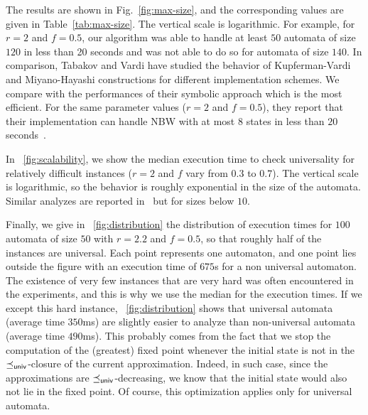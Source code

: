 \documentclass{LMCS}
\begin{document}
The results are shown in Fig.~\ref{fig:max-size}, and the corresponding 
values are given in Table~\ref{tab:max-size}. The vertical scale is logarithmic.
For example, for $r=2$ and $f=0.5$, our algorithm was able to handle at least $50$ automata of size $120$ 
in less than 20 seconds and was not able to do so for automata of size $140$.
In comparison, Tabakov and Vardi have studied the behavior of
Kupferman-Vardi and Miyano-Hayashi constructions for different
implementation schemes. We compare with the performances of their
symbolic approach which is the most efficient. 
For the same parameter values ($r=2$ and $f=0.5$), they
report that their implementation can handle NBW with at most 8 states 
in less than $20$ seconds~\cite{TabakovV07}.     

In \figurename~\ref{fig:scalability}, we show the median execution time to 
check universality for relatively difficult instances ($r=2$ and $f$ vary from
$0.3$ to $0.7$). The vertical scale is logarithmic, so the behavior is roughly 
exponential in the size of the automata. Similar analyzes are reported 
in~\cite{TabakovV07} but for sizes below $10$.

Finally, we give in \figurename~\ref{fig:distribution} the
distribution of execution times for $100$ automata of size $50$ with
$r=2.2$ and $f=0.5$, so that roughly half of the instances are
universal. Each point represents one automaton, and one point lies
outside the figure with an execution time of $675$s for a non
universal automaton. The existence of very few instances that are very
hard was often encountered in the experiments, and this is why we use
the median for the execution times. If we except this hard instance,
\figurename~\ref{fig:distribution} shows that universal automata
(average time $350$ms) are slightly easier to analyze than
non-universal automata (average time $490$ms).  This probably comes
from the fact that we stop the computation of the (greatest) fixed
point whenever the initial state is not in the $\preceq_{{\sf univ}}$-closure
of the current approximation. Indeed, in such
case, since the approximations are $\preceq_{{\sf univ}}$-decreasing,
we know that the initial state would also not lie in the fixed point.
Of course, this optimization applies only for universal automata.
\end{document}

